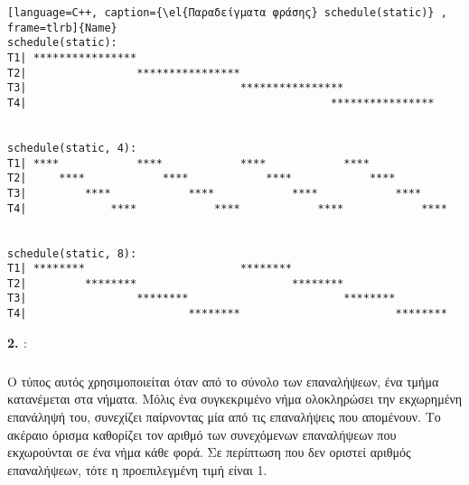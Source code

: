 \begin{lstlisting}[language=C++, caption={\el{Παραδείγματα φράσης} schedule(static)} , frame=tlrb]{Name}
schedule(static):
T1| ****************                                                
T2|                 ****************                                
T3|                                 ****************                
T4|                                               ****************


schedule(static, 4): 
T1| ****            ****            ****            ****            
T2|     ****            ****            ****            ****        
T3|         ****            ****            ****            ****    
T4|             ****            ****            ****            ****


schedule(static, 8):   
T1| ********                        ********                        
T2|         ********                        ********                
T3|                 ********                        ********        
T4|                         ********                        ********
\end{lstlisting}
\clearpage
\textbf{2. \emph{}}: 
\subparagraph{}
Ο τύπος αυτός χρησιμοποιείται όταν από το σύνολο των επαναλήψεων, ένα τμήμα κατανέμεται στα νήματα. Μόλις ένα
συγκεκριμένο νήμα ολοκληρώσει την εκχωρημένη επανάληψή του, συνεχίζει παίρνοντας μία από τις επαναλήψεις που απομένουν.
Το ακέραιο όρισμα \emph{} καθορίζει τον αριθμό των συνεχόμενων επαναλήψεων που εκχωρούνται σε ένα νήμα κάθε
φορά. Σε περίπτωση που δεν οριστεί αριθμός επαναλήψεων, τότε η προεπιλεγμένη τιμή είναι 1. \ \\

